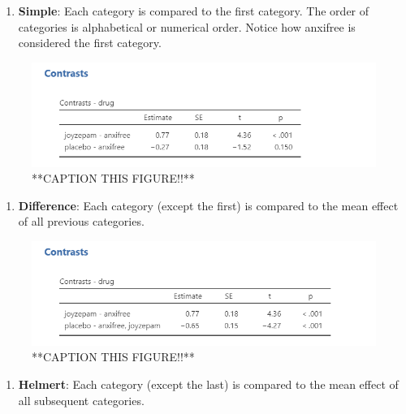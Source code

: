\documentclass[
]{book}
\providecommand{\tightlist}{%
  \setlength{\itemsep}{0pt}\setlength{\parskip}{0pt}}
\begin{document}
\begin{enumerate}
\def\labelenumi{\arabic{enumi}.}
\setcounter{enumi}{1}
\tightlist
\item
  \textbf{Simple}: Each category is compared to the first category. The order of categories is alphabetical or numerical order. Notice how anxifree is considered the first category.
\end{enumerate}

\begin{figure}

{\centering \includegraphics[width=1\linewidth]{images/04_one-way-anova/contrasts_simple} 

}

\caption{**CAPTION THIS FIGURE!!**}\label{fig:unnamed-chunk-9}
\end{figure}

\begin{enumerate}
\def\labelenumi{\arabic{enumi}.}
\setcounter{enumi}{2}
\tightlist
\item
  \textbf{Difference}: Each category (except the first) is compared to the mean effect of all previous categories.
\end{enumerate}

\begin{figure}

{\centering \includegraphics[width=1\linewidth]{images/04_one-way-anova/contrasts_difference} 

}

\caption{**CAPTION THIS FIGURE!!**}\label{fig:unnamed-chunk-10}
\end{figure}

\begin{enumerate}
\def\labelenumi{\arabic{enumi}.}
\setcounter{enumi}{3}
\tightlist
\item
  \textbf{Helmert}: Each category (except the last) is compared to the mean effect of all subsequent categories.
\end{enumerate}
\end{document}
